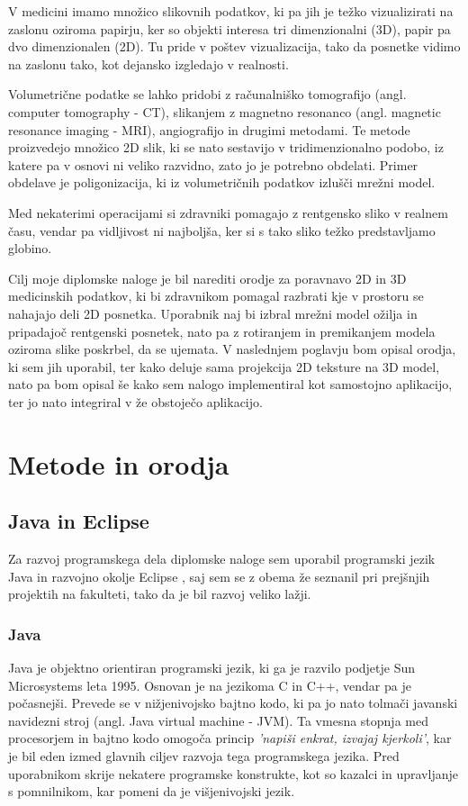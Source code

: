\documentclass[a4paper, 12pt]{book}
\begin{document}
V medicini imamo množico slikovnih podatkov, ki pa jih je težko vizualizirati na zaslonu oziroma papirju, ker so objekti interesa tri dimenzionalni (3D), papir pa dvo dimenzionalen (2D). Tu pride v poštev vizualizacija, tako da posnetke vidimo na zaslonu tako, kot dejansko izgledajo v realnosti.

Volumetrične podatke se lahko pridobi z računalniško tomografijo (angl. computer tomography - CT), slikanjem z magnetno resonanco (angl. magnetic resonance imaging - MRI), angiografijo in drugimi metodami. Te metode proizvedejo množico 2D slik, ki se nato sestavijo v tridimenzionalno podobo, iz katere pa v osnovi ni veliko razvidno, zato jo je potrebno obdelati. Primer obdelave je poligonizacija, ki iz volumetričnih podatkov izlušči mrežni model. 

Med nekaterimi operacijami si zdravniki pomagajo z rentgensko sliko v realnem času, vendar pa vidljivost ni najboljša, ker si s tako sliko težko predstavljamo globino.

Cilj moje diplomske naloge je bil narediti orodje za poravnavo 2D in 3D medicinskih podatkov, ki bi zdravnikom pomagal razbrati kje v prostoru se nahajajo deli 2D posnetka. Uporabnik naj bi izbral mrežni model ožilja in pripadajoč rentgenski posnetek, nato pa z rotiranjem in premikanjem modela oziroma slike poskrbel, da se ujemata. V naslednjem poglavju bom opisal orodja, ki sem jih uporabil, ter kako deluje sama projekcija 2D teksture na 3D model, nato pa bom opisal še kako sem nalogo implementiral kot samostojno aplikacijo, ter jo nato integriral v že obstoječo aplikacijo.

\chapter{Metode in orodja}
\section{Java in Eclipse}
Za razvoj programskega dela diplomske naloge sem uporabil programski jezik Java \cite{Java} in razvojno okolje Eclipse \cite{Eclipse}, saj sem se z obema že seznanil pri prejšnjih projektih na fakulteti, tako da je bil razvoj veliko lažji.
\subsection*{Java}
Java je objektno orientiran programski jezik, ki ga je razvilo podjetje Sun Microsystems leta 1995. Osnovan je na jezikoma C in C++, vendar pa je počasnejši. Prevede se v nižjenivojsko bajtno kodo, ki pa jo nato tolmači javanski navidezni stroj (angl. Java virtual machine - JVM). Ta vmesna stopnja med procesorjem in bajtno kodo omogoča princip \emph{'napiši enkrat, izvajaj kjerkoli'}, kar je bil eden izmed glavnih ciljev razvoja tega programskega jezika. Pred uporabnikom skrije nekatere programske konstrukte, kot so kazalci in upravljanje s pomnilnikom, kar pomeni da je višjenivojski jezik. 
\end{document}
